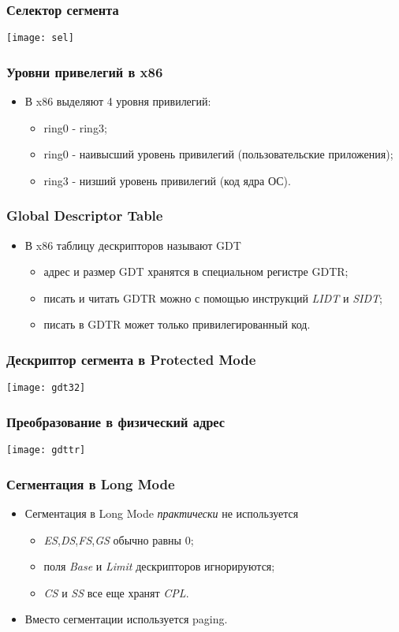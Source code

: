\begin{frame}
\frametitle{Селектор сегмента}
\texttt{[image: sel]}
\end{frame}

\begin{frame}
\frametitle{Уровни привелегий в x86}
\begin{itemize}
    \item<1->В x86 выделяют 4 уровня привилегий:
    \begin{itemize}
        \item<1->ring0 - ring3;
        \item<2->ring0 - наивысший уровень привилегий (пользовательские
        приложения);
        \item<2->ring3 - низший уровень привилегий (код ядра ОС).
    \end{itemize}
\end{itemize}
\end{frame}

\begin{frame}
\frametitle{Global Descriptor Table}
\begin{itemize}
    \item<1->В x86 таблицу дескрипторов называют GDT
    \begin{itemize}
        \item<2->адрес и размер GDT хранятся в специальном регистре GDTR;
        \item<3->писать и читать GDTR можно с помощью инструкций \emph{LIDT}
        и \emph{SIDT};
        \item<4->писать в GDTR может только привилегированный код.
    \end{itemize}
\end{itemize}
\end{frame}

\begin{frame}
\frametitle{Дескриптор сегмента в Protected Mode}
\texttt{[image: gdt32]}
\end{frame}

\begin{frame}
\frametitle{Преобразование в физический адрес}
\texttt{[image: gdttr]}
\end{frame}

\begin{frame}
\frametitle{Сегментация в Long Mode}
\begin{itemize}
    \item<1->Сегментация в Long Mode \emph{практически} не используется
    \begin{itemize}
       \item<2->\emph{ES},\emph{DS},\emph{FS},\emph{GS} обычно равны 0;
       \item<3->поля \emph{Base} и \emph{Limit} дескрипторов игнорируются;
       \item<4->\emph{CS} и \emph{SS} все еще хранят \emph{CPL}.
    \end{itemize}
    \item<5->Вместо сегментации используется paging.
\end{itemize}
\end{frame}

